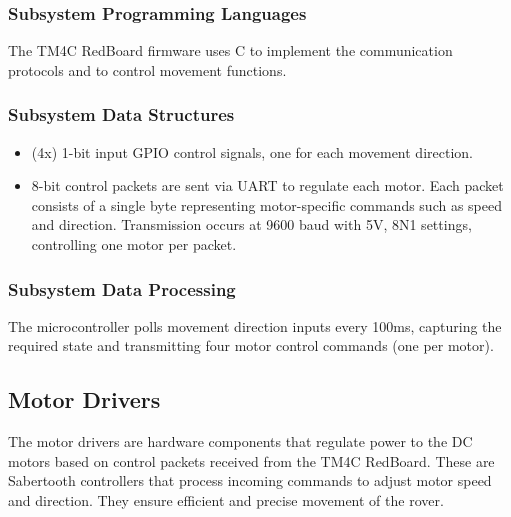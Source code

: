 \subsubsection{Subsystem Programming Languages}
The TM4C RedBoard firmware uses C to implement the communication protocols and to control movement functions.

\subsubsection{Subsystem Data Structures}
\begin{itemize}
    \item (4x) 1-bit input GPIO control signals, one for each movement direction.
    \item 8-bit control packets are sent via UART to regulate each motor. Each packet consists of a single byte representing motor-specific commands such as speed and direction. Transmission occurs at 9600 baud with 5V, 8N1 settings, controlling one motor per packet.
\end{itemize}

\subsubsection{Subsystem Data Processing}
The microcontroller polls movement direction inputs every 100ms, capturing the required state and transmitting four motor control commands (one per motor).
\newpage




\subsection{Motor Drivers}
The motor drivers \cite{Sabertooth} are hardware components that regulate power to the DC motors based on control packets received from the TM4C RedBoard. These are Sabertooth controllers that process incoming commands to adjust motor speed and direction. They ensure efficient and precise movement of the rover.

